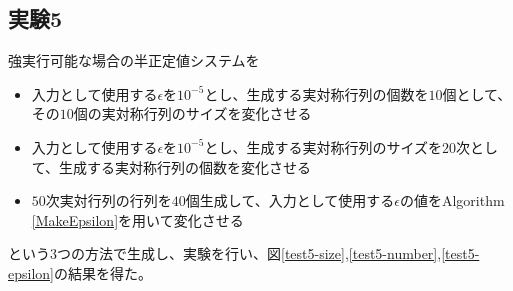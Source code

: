 \subsection{実験5}
強実行可能な場合\cite{FeasibleAnalysis}の半正定値システムを
\begin{itemize}
  \item 入力として使用する$\epsilon$を$10^{-5}$とし、生成する実対称行列の個数を$10$個として、その$10$個の実対称行列のサイズを変化させる
  \item 入力として使用する$\epsilon$を$10^{-5}$とし、生成する実対称行列のサイズを$20$次として、生成する実対称行列の個数を変化させる
  \item $50$次実対行列の行列を$40$個生成して、入力として使用する$\epsilon$の値をAlgorithm \ref{MakeEpsilon}を用いて変化させる
\end{itemize}
という3つの方法で生成し、実験を行い、図\ref{test5-size},\ref{test5-number},\ref{test5-epsilon}の結果を得た。
